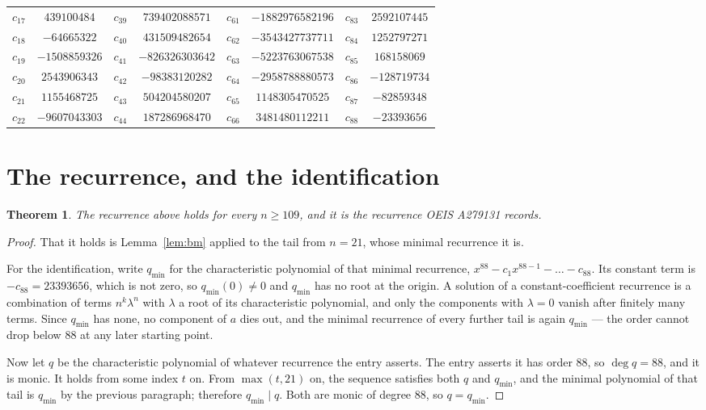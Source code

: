 \documentclass[11pt,a4paper]{article}
\theoremstyle{plain}
\newtheorem{theorem}{Theorem}
\theoremstyle{definition}
\begin{document}
\begin{center}
\begin{tabular}{cccccccc}
$c_{17}$ & $439100484$ & $c_{39}$ & $739402088571$ & $c_{61}$ & $-1882976582196$ & $c_{83}$ & $2592107445$ \\
$c_{18}$ & $-64665322$ & $c_{40}$ & $431509482654$ & $c_{62}$ & $-3543427737711$ & $c_{84}$ & $1252797271$ \\
$c_{19}$ & $-1508859326$ & $c_{41}$ & $-826326303642$ & $c_{63}$ & $-5223763067538$ & $c_{85}$ & $168158069$ \\
$c_{20}$ & $2543906343$ & $c_{42}$ & $-98383120282$ & $c_{64}$ & $-2958788880573$ & $c_{86}$ & $-128719734$ \\
$c_{21}$ & $1155468725$ & $c_{43}$ & $504204580207$ & $c_{65}$ & $1148305470525$ & $c_{87}$ & $-82859348$ \\
$c_{22}$ & $-9607043303$ & $c_{44}$ & $187286968470$ & $c_{66}$ & $3481480112211$ & $c_{88}$ & $-23393656$ \\
\end{tabular}
\end{center}

\section{The recurrence, and the identification}

\begin{theorem}
The recurrence above holds for every $n\ge109$, and it is the recurrence OEIS A279131 records.
\end{theorem}

\begin{proof}
That it holds is Lemma~\ref{lem:bm} applied to the tail from $n=21$, whose minimal
recurrence it is.

For the identification, write $q_{\min}$ for the characteristic polynomial of that minimal
recurrence, $x^{88}-c_1x^{88-1}-\dots-c_{88}$. Its constant term is
$-c_{88}=23393656$, which is not zero, so $q_{\min}(0)\neq0$ and $q_{\min}$ has no
root at the origin. A solution of a constant-coefficient recurrence is a combination of terms
$n^{k}\lambda^{n}$ with $\lambda$ a root of its characteristic polynomial, and only the
components with $\lambda=0$ vanish after finitely many terms. Since $q_{\min}$ has none, no
component of $a$ dies out, and the minimal recurrence of every further tail is again
$q_{\min}$ --- the order cannot drop below $88$ at any later starting point.

Now let $q$ be the characteristic polynomial of whatever recurrence the entry asserts. The
entry asserts it has order $88$, so $\deg q=88$, and it is monic. It holds from some
index $t$ on. From $\max(t,21)$ on, the sequence satisfies both $q$ and $q_{\min}$, and
the minimal polynomial of that tail is $q_{\min}$ by the previous paragraph; therefore
$q_{\min}\mid q$. Both are monic of degree $88$, so $q=q_{\min}$.
\end{proof}
\end{document}
